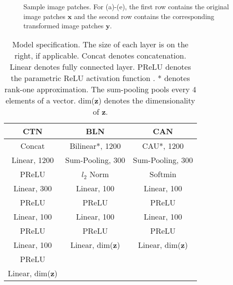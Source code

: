 \documentclass[conference]{IEEEtran}
\begin{document}
\begin{figure}[t]
\centering
{}




\caption{Sample image patches. For (a)-(e), the first row contains the original image patches $\mathbf{x}$ and the second row contains the corresponding transformed image patches $\mathbf{y}$.}
\end{figure}


\begin{table}[h!]
\caption{Model specification. The size of each layer is on the right, if applicable. Concat denotes concatenation. Linear denotes fully connected layer. PReLU denotes the parametric ReLU activation function \cite{he2015delving}. * denotes rank-one approximation. The sum-pooling pools every 4 elements of a vector. dim($\mathbf{z}$) denotes the dimensionality of $\mathbf{z}$.}
\label{models}
\begin{center}
\begin{small}
\begin{tabular}{ccc}
\hline
CTN & BLN & CAN \\
\hline
Concat      & Bilinear*, 1200       & CAU*, 1200    \\
Linear, 1200 & Sum-Pooling, 300      & Sum-Pooling, 300      \\
PReLU       & $l_2$ Norm         & Softmin\\
Linear, 300  & Linear, 100&  Linear, 100 \\
PReLU        & PReLU            & PReLU \\
Linear, 100  &  Linear, 100         & Linear, 100 \\ 
PReLU        & PReLU           & PReLU  \\
Linear, 100  & Linear, dim($\mathbf{z}$) & Linear, dim($\mathbf{z}$)\\ 
PReLU       \\
Linear, dim($\mathbf{z}$)   \\
\hline
\end{tabular}
\end{small}
\end{center}
\end{table}
\end{document}
